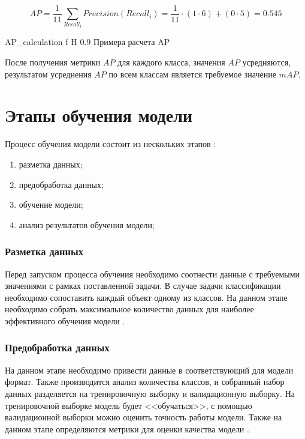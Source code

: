 \begin{equation}
	\label{eq:AP}
	AP = \frac{1}{11}\sum_{Recall_i}Precision(Recall_i) = \frac{1}{11} \cdot (1 \cdot 6) + (0 \cdot 5) = 0.545
\end{equation}


{AP_calculation} %
{f} %
{H} %
{0.9\textwidth} %
{Примера расчета AP} %

После получения метрики $AP$ для каждого класса, значения $AP$ усредняются, результатом усреднения  $AP$ по всем классам является требуемое значение $mAP$.


\section{Этапы обучения модели}
Процесс обучения модели состоит из нескольких этапов \cite{learning}:
\begin{enumerate}
	\item разметка данных;
	\item предобработка данных;
	\item обучение модели;
	\item анализ результатов обучения модели;
\end{enumerate}

\subsubsection{Разметка данных}
Перед запуском процесса обучения необходимо соотнести данные с требуемыми значениями с рамках поставленной задачи. В случае задачи классификации
необходимо сопоставить каждый объект одному из классов. На данном этапе необходимо собрать  максимальное количество данных для наиболее эффективного обучения модели \cite{learning}.

\subsubsection{Предобработка данных}
На данном этапе необходимо привести данные в соответствующий для модели формат. Также производится анализ количества классов, и собранный набор данных
разделяется на тренировочную выборку и валидационную выборку. На тренировочной выборке модель будет <<обучаться>>, с помощью валидационной выборки 
можно оценить точность работы модели. Также на данном этапе определяются метрики для оценки качества модели \cite{learning}.

